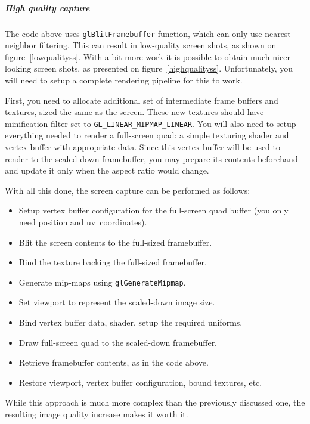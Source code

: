 \documentclass[hidelinks,titlepage,a4paper]{article}
\begin{document}
\subparagraph{High quality capture}

The code above uses \texttt{glBlitFramebuffer} function, which can only use nearest neighbor filtering. This can result in low-quality screen shots, as shown on figure~\ref{lowqualityss}. With a bit more work it is possible to obtain much nicer looking screen shots, as presented on figure~\ref{highqualityss}. Unfortunately, you will need to setup a complete rendering pipeline for this to work.

First, you need to allocate additional set of intermediate frame buffers and textures, sized the same as the screen. These new textures should have minification filter set to \texttt{GL\_LINEAR\_MIPMAP\_LINEAR}. You will also need to setup everything needed to render a full-screen quad: a simple texturing shader and vertex buffer with appropriate data. Since this vertex buffer will be used to render to the scaled-down framebuffer, you may prepare its contents beforehand and update it only when the aspect ratio would change.

With all this done, the screen capture can be performed as follows:

\begin{itemize}
\item Setup vertex buffer configuration for the full-screen quad buffer (you only need position and uv~coordinates).
\item Blit the screen contents to the full-sized framebuffer.
\item Bind the texture backing the full-sized framebuffer.
\item Generate mip-maps using \texttt{glGenerateMipmap}.
\item Set viewport to represent the scaled-down image size.
\item Bind vertex buffer data, shader, setup the required uniforms.
\item Draw full-screen quad to the scaled-down framebuffer.
\item Retrieve framebuffer contents, as in the code above.
\item Restore viewport, vertex buffer configuration, bound textures, etc.
\end{itemize}

While this approach is much more complex than the previously discussed one, the resulting image quality increase makes it worth it.
\end{document}
